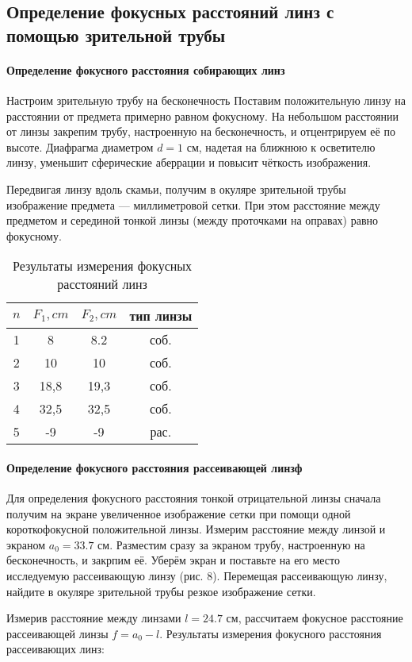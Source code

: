 \subsection{Определение фокусных расстояний линз с помощью зрительной трубы}
\paragraph{Определение фокусного расстояния собирающих линз}


Настроим зрительную трубу на бесконечность
Поставим положительную линзу на расстоянии от предмета примерно равном фокусному. На небольшом расстоянии от линзы закрепим трубу, настроенную на бесконечность,
и отцентрируем её по высоте. Диафрагма диаметром $d = 1$ см, надетая на ближнюю к осветителю линзу, уменьшит сферические аберрации и повысит чёткость изображения.

Передвигая линзу вдоль скамьи, получим в окуляре зрительной трубы изображение предмета — миллиметровой сетки. При этом расстояние между предметом и серединой тонкой линзы (между проточками на оправах) равно фокусному.

    \begin{table}[h!]
        \centering
            \begin{tabular}{| c | c | c | c |}

                \hline
                    $n$ & $F_1, cm$ & $F_2, cm$ &  тип линзы\\
                \hline
                    1 & 8 & 8.2 & соб. \\
                \hline
                    2 & 10 & 10 & соб.\\
                \hline
                    3 & 18,8 & 19,3  & соб. \\
                \hline
                    4 & 32,5 & 32,5 & соб. \\
                \hline
                    5 & -9 & -9 &  рас.\\
                \hline
                \end{tabular}
        \caption{Результаты измерения фокусных расстояний линз}
        \label{nu1}
    \end{table}
    

\paragraph{Определение фокусного расстояния рассеивающей линзф}

Для определения фокусного расстояния тонкой отрицательной линзы сначала получим на экране увеличенное изображение сетки при помощи одной короткофокусной положительной линзы. Измерим расстояние между линзой и экраном $a_0 = 33.7$ см.
Разместим сразу за экраном трубу, настроенную на бесконечность, и закрпим её. Уберём экран и поставьте на его место исследуемую рассеивающую линзу (рис. 8). Перемещая рассеивающую линзу, найдите в окуляре зрительной трубы резкое изображение сетки. \par
Измерив расстояние между линзами $l = 24.7$ см, рассчитаем фокусное расстояние рассеивающей линзы $f = a_0 - l$.
Результаты измерения фокусного расстояния рассеивающих линз:

